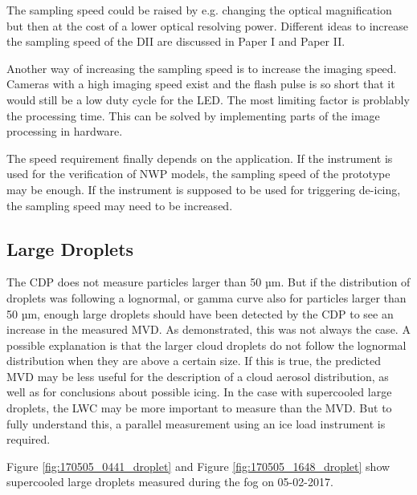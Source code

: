 The sampling speed could be raised by e.g. changing the optical magnification but then at the cost of a lower optical resolving power. Different ideas to increase the sampling speed of the DII are discussed in Paper I and Paper II.

Another way of increasing the sampling speed is to increase the imaging speed. Cameras with a high imaging speed exist and the flash pulse is so short that it would still be a low duty cycle for the LED. The most limiting factor is problably the processing time. This can be solved by implementing parts of the image processing in hardware.

The speed requirement finally depends on the application. If the instrument is used for the verification of NWP models, the sampling speed of the prototype may be enough. If the instrument is supposed to be used for triggering de-icing, the sampling speed may need to be increased.

\subsection{Large Droplets}

The CDP does not measure particles larger than 50 µm. But if the distribution of droplets was following a lognormal, or gamma curve \cite{miles2000,lee2010} also for particles larger than 50 µm, enough large droplets should have been detected by the CDP to see an increase in the measured MVD. As demonstrated, this was not always the case. A possible explanation is that the larger cloud droplets do not follow the lognormal distribution when they are above a certain size. If this is true, the predicted MVD may be less useful for the description of a cloud aerosol distribution, as well as for conclusions about possible icing. In the case with supercooled large droplets, the LWC may be more important to measure than the MVD. But to fully understand this, a parallel measurement using an ice load instrument is required.

Figure \ref{fig:170505_0441_droplet} and Figure \ref{fig:170505_1648_droplet} show supercooled large droplets measured during the fog on 05-02-2017.

